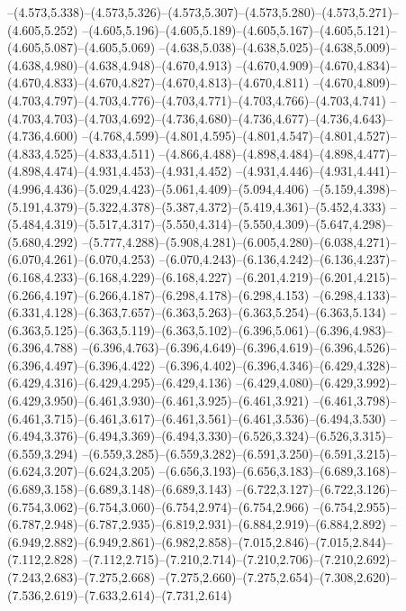   --(4.573,5.338)--(4.573,5.326)--(4.573,5.307)--(4.573,5.280)--(4.573,5.271)--(4.605,5.252)%
  --(4.605,5.196)--(4.605,5.189)--(4.605,5.167)--(4.605,5.121)--(4.605,5.087)--(4.605,5.069)%
  --(4.638,5.038)--(4.638,5.025)--(4.638,5.009)--(4.638,4.980)--(4.638,4.948)--(4.670,4.913)%
  --(4.670,4.909)--(4.670,4.834)--(4.670,4.833)--(4.670,4.827)--(4.670,4.813)--(4.670,4.811)%
  --(4.670,4.809)--(4.703,4.797)--(4.703,4.776)--(4.703,4.771)--(4.703,4.766)--(4.703,4.741)%
  --(4.703,4.703)--(4.703,4.692)--(4.736,4.680)--(4.736,4.677)--(4.736,4.643)--(4.736,4.600)%
  --(4.768,4.599)--(4.801,4.595)--(4.801,4.547)--(4.801,4.527)--(4.833,4.525)--(4.833,4.511)%
  --(4.866,4.488)--(4.898,4.484)--(4.898,4.477)--(4.898,4.474)--(4.931,4.453)--(4.931,4.452)%
  --(4.931,4.446)--(4.931,4.441)--(4.996,4.436)--(5.029,4.423)--(5.061,4.409)--(5.094,4.406)%
  --(5.159,4.398)--(5.191,4.379)--(5.322,4.378)--(5.387,4.372)--(5.419,4.361)--(5.452,4.333)%
  --(5.484,4.319)--(5.517,4.317)--(5.550,4.314)--(5.550,4.309)--(5.647,4.298)--(5.680,4.292)%
  --(5.777,4.288)--(5.908,4.281)--(6.005,4.280)--(6.038,4.271)--(6.070,4.261)--(6.070,4.253)%
  --(6.070,4.243)--(6.136,4.242)--(6.136,4.237)--(6.168,4.233)--(6.168,4.229)--(6.168,4.227)%
  --(6.201,4.219)--(6.201,4.215)--(6.266,4.197)--(6.266,4.187)--(6.298,4.178)--(6.298,4.153)%
  --(6.298,4.133)--(6.331,4.128)--(6.363,7.657)--(6.363,5.263)--(6.363,5.254)--(6.363,5.134)%
  --(6.363,5.125)--(6.363,5.119)--(6.363,5.102)--(6.396,5.061)--(6.396,4.983)--(6.396,4.788)%
  --(6.396,4.763)--(6.396,4.649)--(6.396,4.619)--(6.396,4.526)--(6.396,4.497)--(6.396,4.422)%
  --(6.396,4.402)--(6.396,4.346)--(6.429,4.328)--(6.429,4.316)--(6.429,4.295)--(6.429,4.136)%
  --(6.429,4.080)--(6.429,3.992)--(6.429,3.950)--(6.461,3.930)--(6.461,3.925)--(6.461,3.921)%
  --(6.461,3.798)--(6.461,3.715)--(6.461,3.617)--(6.461,3.561)--(6.461,3.536)--(6.494,3.530)%
  --(6.494,3.376)--(6.494,3.369)--(6.494,3.330)--(6.526,3.324)--(6.526,3.315)--(6.559,3.294)%
  --(6.559,3.285)--(6.559,3.282)--(6.591,3.250)--(6.591,3.215)--(6.624,3.207)--(6.624,3.205)%
  --(6.656,3.193)--(6.656,3.183)--(6.689,3.168)--(6.689,3.158)--(6.689,3.148)--(6.689,3.143)%
  --(6.722,3.127)--(6.722,3.126)--(6.754,3.062)--(6.754,3.060)--(6.754,2.974)--(6.754,2.966)%
  --(6.754,2.955)--(6.787,2.948)--(6.787,2.935)--(6.819,2.931)--(6.884,2.919)--(6.884,2.892)%
  --(6.949,2.882)--(6.949,2.861)--(6.982,2.858)--(7.015,2.846)--(7.015,2.844)--(7.112,2.828)%
  --(7.112,2.715)--(7.210,2.714)--(7.210,2.706)--(7.210,2.692)--(7.243,2.683)--(7.275,2.668)%
  --(7.275,2.660)--(7.275,2.654)--(7.308,2.620)--(7.536,2.619)--(7.633,2.614)--(7.731,2.614)%
